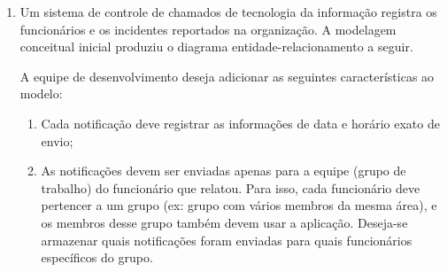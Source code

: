 \documentclass[12pt,a4paper]{article}
\begin{document}
\begin{enumerate}
\begin{enumerate}[label=\Alph*]
    \item \textbf{ESCALACAO\_GERAL}(\underline{cod\_partida}: inteiro, data: data, fase: texto, \underline{id\_passaporte}: texto, nome\_jogador: texto, id\_estadio: inteiro, nome\_estadio: texto)
    
    \item \textbf{JOGADOR}(\underline{id\_passaporte}: texto, nome: texto) \\
    \textbf{PARTIDA}(\underline{cod\_partida}: inteiro, data: data, fase: texto, id\_estadio: inteiro, nome\_estadio, id\_passaporte: texto) \\
    \textit{id\_passaporte referencia JOGADOR(id\_passaporte)}
\end{enumerate}  
\vspace{0.8cm}

 \item Um sistema de controle de chamados de tecnologia da informação registra os funcionários e os incidentes reportados na organização. A modelagem conceitual inicial produziu o diagrama entidade-relacionamento a seguir.

\begin{center}
\end{center}

A equipe de desenvolvimento deseja adicionar as seguintes características ao modelo:
\begin{enumerate}[label=\roman*]
    \item Cada notificação deve registrar as informações de data e horário exato de envio;
    \item As notificações devem ser enviadas apenas para a equipe (grupo de trabalho) do funcionário que relatou. Para isso, cada funcionário deve pertencer a um grupo (ex: grupo com vários membros da mesma área), e os membros desse grupo também devem usar a aplicação. Deseja-se armazenar quais notificações foram enviadas para quais funcionários específicos do grupo.
\end{enumerate}


\end{enumerate}
\end{document}
